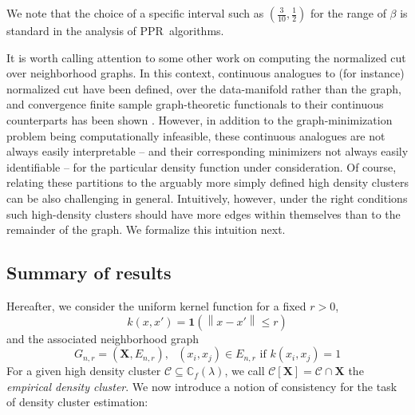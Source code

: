 \documentclass{article}
\newcommand{\norm}[1]{\left\lVert#1\right\rVert}
\newcommand{\1}{\mathbf{1}}
\newcommand{\Xbf}{\mathbf{X}}
\newcommand{\Cbb}{\mathbb{C}}
\newcommand{\Cset}{\mathcal{C}}
\newcommand{\pprspace}{{\sc PPR~}}
\theoremstyle{aldenthm}
\theoremstyle{aldenrmrk}
\begin{document}
We note that the choice of a specific interval such as $(\frac{3}{10}, \frac{1}{2})$ for the range of $\beta$ is standard in the analysis of \pprspace algorithms. 

It is worth calling attention to some other work on computing the normalized cut over neighborhood graphs. In this context, continuous analogues to (for instance) normalized cut have been defined, over the data-manifold rather than the graph, and convergence finite sample graph-theoretic functionals to their continuous counterparts has been shown
\cite{garciatrillos16, arias-castro12, maier11}.
However, in addition to the graph-minimization problem being computationally infeasible, these continuous analogues are not always easily interpretable -- and their corresponding minimizers not always easily identifiable -- for the particular density function under consideration. Of course, relating these partitions to the arguably more simply defined high density clusters can be also challenging in general. Intuitively, however, under the right conditions such high-density clusters should have more edges within themselves than to the remainder of the graph. We formalize this intuition next.




\subsection{Summary of results}

Hereafter, we consider the uniform kernel function for a fixed $r > 0$,
\begin{equation}
k(x,x') = \1(\norm{x - x'} \leq r)
\end{equation}
and the associated neighborhood graph
\begin{equation}
\label{eqn: neighborhood_graph}
G_{n,r} = (\Xbf, E_{n,r}), \text{  $(x_i,x_j) \in E_{n,r}$ if $k(x_i,x_j) = 1$}
\end{equation}
For a given high density cluster $\Cset \subseteq \Cbb_f(\lambda)$, we call $\Cset[\Xbf] = \Cset \cap \Xbf$ the \emph{empirical density cluster}. We now introduce a notion of consistency for the task of density cluster estimation:
\end{document}
